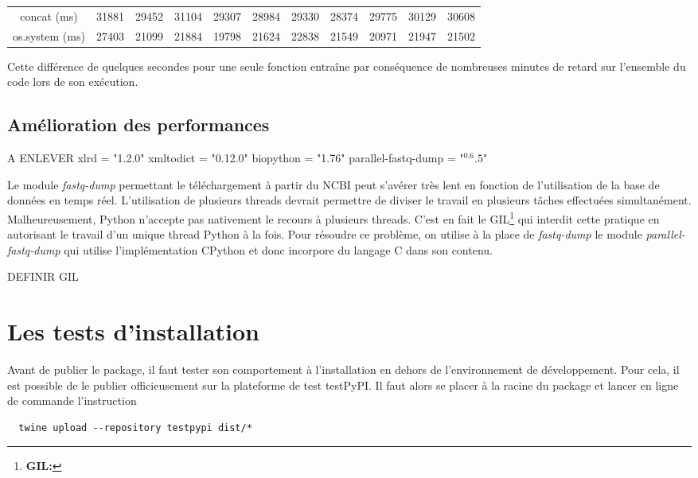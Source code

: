 \documentclass[twoside,a4paper,11pt,frenchb,openany]{report}
\begin{document}
\begin{tabular}{c|c|c|c|c|c|c|c|c|c|c}
concat (ms) & 31881 & 29452 & 31104 & 29307 & 28984 & 29330 & 28374 & 29775 & 30129 & 30608 \\
os.system (ms) & 27403 & 21099 & 21884 & 19798 & 21624 & 22838 & 21549 & 20971 & 21947 & 21502
\end{tabular}

Cette différence de quelques secondes pour une seule fonction entraîne par conséquence de nombreuses minutes de retard sur l'ensemble du code lors de son exécution.


\subsection{Amélioration des performances}

A ENLEVER
xlrd = "1.2.0"
xmltodict = "0.12.0"
biopython = "1.76"
parallel-fastq-dump = "$^0.6.5$"

Le module \textit{fastq-dump} permettant le téléchargement à partir du NCBI peut s'avérer très lent en fonction de l'utilisation de la base de données en temps réel. L'utilisation de plusieurs threads devrait permettre de diviser le travail en plusieurs tâches effectuées simultanément. Malheureusement, Python n'accepte pas nativement le recours à  plusieurs threads. C'est en fait le GIL\footnote{\textbf{GIL:} } qui interdit cette pratique en autorisant le travail d'un unique thread Python à la fois. Pour résoudre ce problème, on utilise à la place de \textit{fastq-dump} le module \textit{parallel-fastq-dump} qui utilise l'implémentation CPython et donc incorpore du langage C dans son contenu.

 

DEFINIR GIL


\section{Les tests d'installation}

Avant de publier le package, il faut tester son comportement à l'installation en dehors de l'environnement de développement. Pour cela, il est possible de le publier officieusement sur la plateforme de test testPyPI. Il faut alors se placer à la racine du package et lancer en ligne de commande l'instruction
\begin{verbatim}  twine upload --repository testpypi dist/*\end{verbatim}
\end{document}
